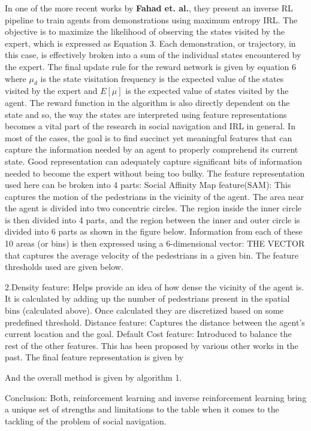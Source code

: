In one of the more recent works by \textbf{Fahad et. al.}, they present an inverse RL pipeline to train agents from demonstrations using maximum entropy IRL.
The objective is to maximize the likelihood of observing the states visited by the expert, which is expressed as Equation 3.
Each demonstration, or trajectory, in this case, is effectively broken into a sum of the individual states encountered by the expert. The final update rule for the reward network is given by equation 6 
where $\mu_{d}$ is the state visitation frequency is the expected value of the states visited by the expert and $E[\mu]$ is the expected value of states visited by the agent. The reward function in the algorithm is also directly dependent on the state and so, the way the states are interpreted using feature representations becomes a vital part of the research in social navigation and IRL in general. 
In most of the cases, the goal is to find succinct yet meaningful features that can capture the information needed by an agent to properly comprehend its current state. Good representation can adequately capture significant bits of information needed to become the expert without being too bulky.  The feature representation used here can be broken into 4 parts:
Social Affinity Map feature(SAM): This captures the motion of the pedestrians in the vicinity of the agent. The area near the agent is divided into two concentric circles. The region inside the inner circle is then divided into 4 parts, and the region between the inner and outer circle is divided into 6 parts as shown in the figure below.
Information from each of these 10 areas (or bins) is then expressed using a 6-dimensional vector:
THE VECTOR	
that captures the average velocity of the pedestrians in a given bin. The feature thresholds used are given below.

2.Density feature: Helps provide an idea of how dense the vicinity of the agent is. It is calculated by adding up the number of pedestrians present in the spatial bins (calculated above). Once calculated they are discretized based on some predefined threshold.
Distance feature: Captures the distance between the agent's current location and the goal.
Default Cost feature: Introduced to balance the rest of the other features. This has been proposed by various other works in the past.
The final feature representation is given by 

And the overall method is given by algorithm 1.


Conclusion:
Both, reinforcement learning and inverse reinforcement learning bring a unique set of strengths and limitations to the table when it comes to the tackling of the problem of social navigation. 

